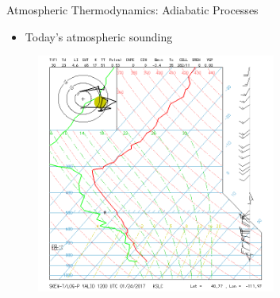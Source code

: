 
\begin{frame}{Atmospheric Thermodynamics: Adiabatic Processes}

\begin{itemize}
	\item Today's atmospheric sounding
\end{itemize}
\begin{figure}
	\includegraphics[width=0.7\textwidth]{fig7}
\end{figure}
\end{frame}






